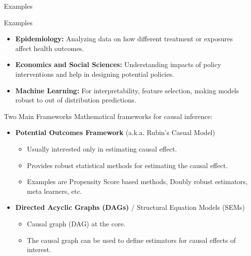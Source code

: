 \documentclass[aspectratio=169]{beamer}
\begin{document}
\begin{frame}{Examples}
\end{frame}

\begin{frame}{Examples}
	\begin{itemize}
		\item \textbf{Epidemiology:} Analyzing data on how different treatment or exposures affect health outcomes.
		\item \textbf{Economics and Social Sciences:} Understanding impacts of policy interventions and help in designing potential policies.
		\item \textbf{Machine Learning:} For interpretability, feature selection, making models robust to out of distribution predictions.
	\end{itemize}
\end{frame}

\begin{frame}{Two Main Frameworks}
	Mathematical frameworks for causal inference:
	\vspace{0.5em}
	\begin{itemize}
		\item \textbf{Potential Outcomes Framework} (a.k.a. Rubin's Casual Model)
			\begin{itemize}
				\item Usually interested only in estimating causal effect.
				\item Provides robust statistical methods for estimating the causal effect.
				\item Examples are Propensity Score based methods, Doubly robust estimators, meta learners, etc.
			\end{itemize}
	\end{itemize}
	\vspace{1em}
	\begin{itemize}
		\item \textbf{Directed Acyclic Graphs (DAGs)} / Structural Equation Models (SEMs)
			\begin{itemize}
				\item Causal graph (DAG) at the core.
				\item The causal graph can be used to define estimators for causal effects of interest.
			\end{itemize}
	\end{itemize}
\end{frame}
\end{document}
